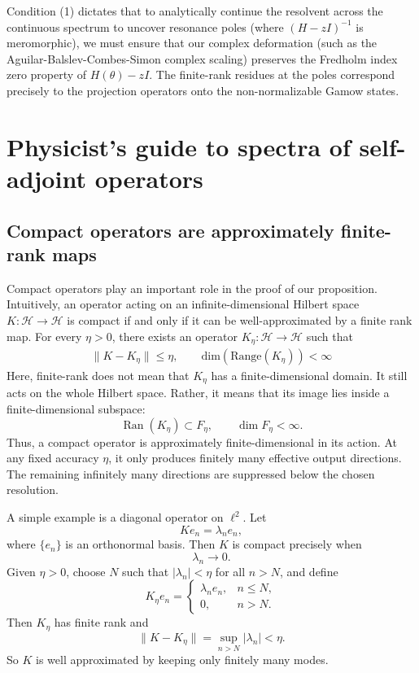 \documentclass[JHEP,12pt]{article}
\def\mH{\mathcal{H}}
\begin{document}
Condition (1) dictates that to analytically continue the resolvent across the continuous spectrum to uncover resonance poles (where $(H - zI)^{-1}$ is meromorphic), we must ensure that our complex deformation (such as the Aguilar-Balslev-Combes-Simon complex scaling) preserves the Fredholm index zero property of $H(\theta) - zI$. The finite-rank residues at the poles correspond precisely to the projection operators onto the non-normalizable Gamow states.

\section{Physicist's guide to spectra of self-adjoint operators}

\subsection{Compact operators are approximately finite-rank maps}

Compact operators play an important role in the proof of our proposition. Intuitively, an operator acting on an infinite-dimensional Hilbert space $K:\mH\to \mH$ is compact if and only if it can be well-approximated by a finite rank map. For every $\eta>0$, there exists an operator $K_\eta:\mH\to \mH$ such that 
\begin{align}
    \|K-K_\eta\|\leq \eta, \qquad \text{dim}(\text{Range}(K_\eta))<\infty
\end{align}
Here, finite-rank does not mean that \(K_\eta\) has a finite-dimensional domain.
It still acts on the whole Hilbert space. Rather, it means that its image lies
inside a finite-dimensional subspace:
\[
\operatorname{Ran}(K_\eta)\subset F_\eta,
\qquad
\dim F_\eta<\infty .
\]
Thus, a compact operator is approximately finite-dimensional in its action. At
any fixed accuracy \(\eta\), it only produces finitely many effective output
directions. The remaining infinitely many directions are suppressed below the
chosen resolution.

A simple example is a diagonal operator on \(\ell^2\). Let
\[
K e_n=\lambda_n e_n,
\]
where \(\{e_n\}\) is an orthonormal basis. Then \(K\) is compact precisely when
\[
\lambda_n\to 0 .
\]
Given \(\eta>0\), choose \(N\) such that \(|\lambda_n|<\eta\) for all \(n>N\),
and define
\[
K_\eta e_n=
\begin{cases}
\lambda_n e_n, & n\le N,\\
0, & n>N .
\end{cases}
\]
Then \(K_\eta\) has finite rank and
\[
\|K-K_\eta\|=\sup_{n>N}|\lambda_n|<\eta .
\]
So \(K\) is well approximated by keeping only finitely many modes.
\end{document}
